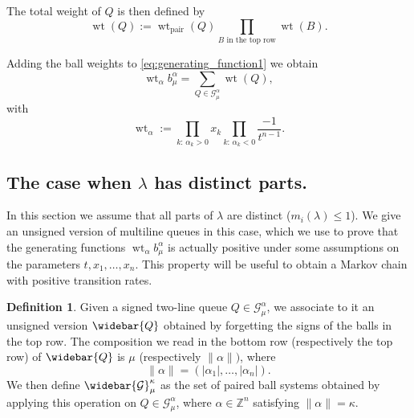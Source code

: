 \documentclass[12pt]{amsart}
\theoremstyle{definition}
\newtheorem{definition}[thm]{Definition}
\DeclareMathOperator{\wt}{wt}
\DeclareMathOperator{\pair}{pair}
\newcommand{\ZZ}{\mathbb Z}
\newcommand{\mcG}{\mathcal{G}}
\newcommand{\Gbar}{\widebar{\mathcal{G}}}
\newcommand{\Qbar}{\widebar{Q}}
\begin{document}
The total weight of $Q$ is then defined by 
$$\wt(Q):=\wt_{\pair}(Q)\prod_{B \text{ in the top row}}\wt(B).$$

Adding the ball weights to \cref{eq:generating_function1} we obtain 
\begin{equation}\label{eq:generating_function2}
    \wt_\alpha b_\mu^\alpha=\sum_{Q\in\mcG_\mu^\alpha}\wt(Q),
\end{equation}
with 
\begin{equation}
  \wt_\alpha:=\prod_{k:\,\alpha_k>0}x_k  \prod_{k:\, \alpha_k<0}\frac{-1}{t^{n-1}}.
\end{equation}


\subsection{The case when \texorpdfstring{$\lambda$}{lambda} has distinct parts.}\label{ssec:MLQ_distinct_parts}
In this section we assume that all parts of $\lambda$ are distinct ($m_i(\lambda)\leq 1$). We give an unsigned version of multiline queues in this case, which we use to prove that the generating functions $\wt_\alpha b_\mu^\alpha$ is actually positive under some assumptions on the parameters $t, x_1,\dots, x_n$. This property will be useful to obtain a Markov chain with positive transition rates.


\begin{definition}\label{def:Gbar}
Given a signed two-line queue $Q\in \mcG^\alpha_{\mu}$, we associate to it an unsigned version $\Qbar$ obtained by forgetting the signs of the balls in the top row. The composition we read in the bottom row (respectively the top row) of $\Qbar$ is $\mu$ (respectively $\lVert \alpha\rVert)$, where 
$$\lVert \alpha\rVert=(|\alpha_1|,\dots,|\alpha_n|).$$
We then define $\Gbar_\mu^{\kappa}$ as the set of paired ball systems obtained by applying this operation on $Q\in \mcG^\alpha_\mu$, where $\alpha\in \ZZ^n$ satisfying $\lVert\alpha\rVert=\kappa$.
\end{definition}
\end{document}
